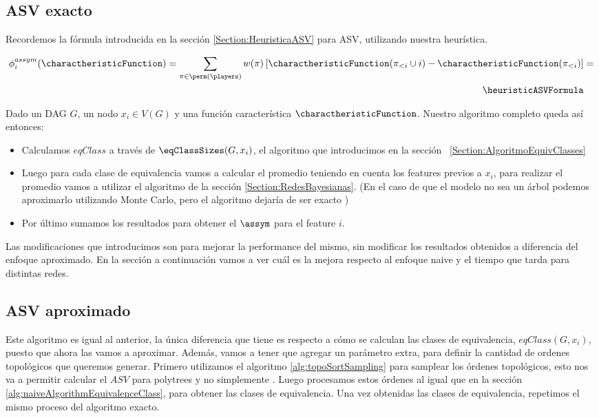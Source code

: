 
\subsection{ASV exacto}

Recordemos la fórmula introducida en la sección \ref{Section:HeuristicaASV} para ASV, utilizando nuestra heurística.

\begin{align*}
   \phi_{i}^{assym}(\charactheristicFunction) = \sum_{\pi \in \perm(\players)} w(\pi) \left[ \charactheristicFunction(\pi_{<i} \cup {i}) - \charactheristicFunction(\pi_{<i}) \right] &= \\
   \heuristicASVFormula
\end{align*}

Dado un DAG $G$, un nodo $x_i \in V(G)$ y una función característica $\charactheristicFunction$. Nuestro algoritmo completo queda así entonces: 

\begin{itemize}
    \item Calculamos $eqClass$ a través de $\eqClassSizes(G,x_i)$, el algoritmo que introducimos en la sección~ \ref{Section:AlgoritmoEquivClasses}
    \item Luego para cada clase de equivalencia vamos a calcular el promedio teniendo en cuenta los features previos a $x_i$, para realizar el promedio vamos a utilizar el algoritmo de la sección \ref{Section:RedesBayesianas}. (En el caso de que el modelo no sea un árbol podemos aproximarlo utilizando Monte Carlo, pero el algoritmo dejaría de ser exacto )
    \item Por último sumamos los resultados para obtener el $\assym$ para el feature $i$. 
\end{itemize}

Las modificaciones que introducimos son para mejorar la performance del mismo, sin modificar los resultados obtenidos a diferencia del enfoque aproximado. En la sección a continuación vamos a ver cuál es la mejora respecto al enfoque naive y el tiempo que tarda para distintas redes.  

\subsection{ASV aproximado}

Este algoritmo es igual al anterior, la única diferencia que tiene es respecto a cómo se calculan las clases de equivalencia, $eqClass(G, x_i)$, puesto que ahora las vamos a aproximar. Además, vamos a tener que agregar un parámetro extra, para definir la cantidad de ordenes topológicos que queremos generar. 
Primero utilizamos el algoritmo \ref{alg:topoSortSampling} para samplear los órdenes topológicos, esto nos va a permitir calcular el $ASV$ para polytrees y no simplemente \dtrees. Luego procesamos estos órdenes al igual que en la sección \ref{alg:naiveAlgorithmEquivalenceClass}, para obtener las clases de equivalencia. Una vez obtenidas las clases de equivalencia, repetimos el mismo proceso del algoritmo exacto. 
